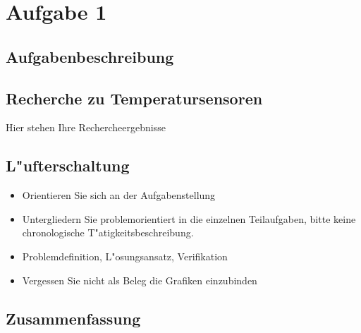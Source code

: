 \section{Aufgabe 1}

\subsection{Aufgabenbeschreibung}

\subsection{Recherche zu Temperatursensoren}
Hier stehen Ihre Rechercheergebnisse
\subsection{L"ufterschaltung}

\begin{itemize}
	\item Orientieren Sie sich an der Aufgabenstellung
	\item Untergliedern Sie problemorientiert in die einzelnen Teilaufgaben, bitte keine chronologische T"atigkeitsbeschreibung.
	\item Problemdefinition, L"osungsansatz, Verifikation
	\item Vergessen Sie nicht als Beleg die Grafiken einzubinden
\end{itemize}
\subsection{Zusammenfassung}